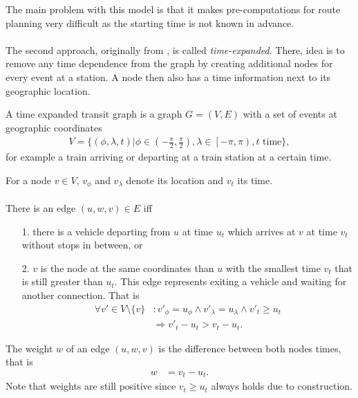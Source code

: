 	The main problem with this model is that it makes pre-computations for route planning very difficult as
	the starting time is not known in advance.\\\\
	The second approach, originally from , is called \textit{time-expanded}.
	There, idea is to remove any time dependence from the graph by creating additional nodes for every
	event at a station. A node then also has a time information next to its geographic location.
	\begin{mydef}\label{simpleTransitGraph}
		A \textnormal{time expanded transit graph} is a graph $G = (V, E)$ with a set of events at geographic coordinates
		\begin{align*}
			V = \{(\phi, \lambda, t) | \phi \in \left(-\frac{\pi}{2}, \frac{\pi}{2}\right), \lambda \in \left[-\pi, \pi\right), t \text{ time}\},
		\end{align*}
		for example a train arriving or departing at a train station at a certain time.
		
		For a node $v \in V$, $v_\phi$ and $v_\lambda$ denote its location and $v_t$  its time.\\\\
		There is an edge $(u, w, v) \in E$ iff
		\begin{itemize}
			\item[1.] there is a vehicle departing from $u$ at time $u_t$ which arrives at $v$ at time $v_t$ without stops in between, or
			\item[2.] $v$ is the node at the same coordinates than $u$ with the smallest time $v_t$ that is still
			greater than $u_t$. This edge represents exiting a vehicle and waiting for another connection. That is
			\begin{align*}
				\forall v' \in V \setminus \{v\}	&: v'_\phi = u_\phi \land v'_\lambda = u_\lambda \land v'_t \ge u_t\\
									&\Rightarrow v'_t - u_t > v_t - u_t.
			\end{align*}
		\end{itemize}
		The weight $w$ of an edge $(u, w, v)$ is the difference between both nodes times, that is
		\begin{align*}
			w	&= v_t - u_t.
		\end{align*}
		Note that weights are still positive since $v_t \ge u_t$ always holds due to construction.
	\end{mydef}

